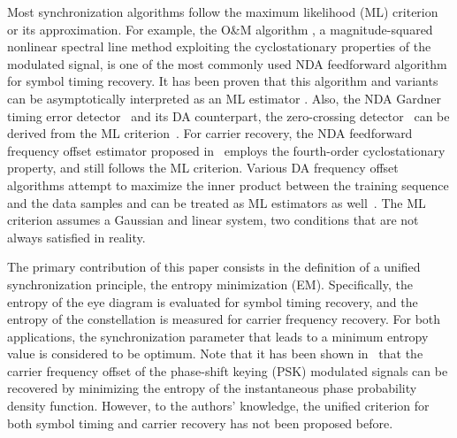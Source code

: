 \documentclass[journal,comsoc,onecolumn, 12pt,draftclsnofoot]{IEEEtran}
\begin{document}
Most synchronization algorithms follow the maximum likelihood (ML) criterion or its approximation.
For example, the O\&M algorithm \cite{Oerder1988}, a magnitude-squared nonlinear spectral line method exploiting the cyclostationary properties of the modulated signal, is one of the most commonly used NDA feedforward algorithm for symbol timing recovery.
It has been proven that this algorithm and variants can be asymptotically interpreted as an ML estimator \cite{YanWang2002,Lopez-Salcedo2006}.
Also, the NDA Gardner timing error detector~\cite{Gardner1986} and its DA counterpart, the zero-crossing detector~\cite{gardner1988demodulator} can be derived from the ML criterion~\cite{Oerder1987}.
For carrier recovery, the NDA feedforward frequency offset estimator proposed in~\cite{Wang2004} employs the fourth-order cyclostationary property, and still follows the ML criterion.
Various DA frequency offset algorithms attempt to maximize the inner product between the  training sequence and the data samples and can be treated as ML estimators as well~\cite{mengali1997synchronization}.
The ML criterion assumes a Gaussian and linear system, two conditions that are not always satisfied in reality. 

The primary contribution of this paper consists in the definition of a unified synchronization principle, the entropy minimization (EM). 
Specifically, the entropy of the eye diagram is evaluated for symbol timing recovery, and the entropy of the constellation is measured for carrier frequency recovery.
For both applications, the synchronization parameter that leads to a minimum entropy value is considered to be optimum.
Note that it has been shown in~\cite{Pedzisz2006} that the carrier frequency offset of the phase-shift keying (PSK) modulated signals can be recovered by minimizing the entropy of the instantaneous phase probability density function.
However, to the authors' knowledge,  the unified criterion for both symbol timing and carrier recovery has not been proposed before. 
\end{document}
